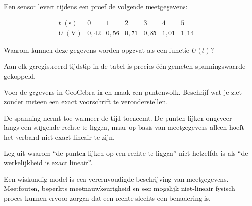 \documentclass{ximera}
\begin{document}
\begin{oefening}{\oefG}

Een sensor levert tijdens een proef de volgende meetgegevens:

\[
\begin{array}{c|cccccc}
t\;(\mathrm{s})&0&1&2&3&4&5\\
\hline
U\;(\mathrm{V})&0{,}42&0{,}56&0{,}71&0{,}85&1{,}01&1{,}14
\end{array}
\]

\begin{question}
Waarom kunnen deze gegevens worden opgevat als een functie \(U(t)\)?

\begin{oplossing}
Aan elk geregistreerd tijdstip in de tabel is precies één gemeten
spanningswaarde gekoppeld.
\end{oplossing}
\end{question}

\begin{question}
Voer de gegevens in GeoGebra in en maak een puntenwolk.
Beschrijf wat je ziet zonder meteen een exact voorschrift te veronderstellen.

\begin{oplossing}
De spanning neemt toe wanneer de tijd toeneemt. De punten lijken ongeveer
langs een stijgende rechte te liggen, maar op basis van meetgegevens alleen
hoeft het verband niet exact lineair te zijn.
\end{oplossing}
\end{question}

\begin{question}
Leg uit waarom ``de punten lijken op een rechte te liggen'' niet hetzelfde is
als ``de werkelijkheid is exact lineair''.

\begin{oplossing}
Een wiskundig model is een vereenvoudigde beschrijving van meetgegevens.
Meetfouten, beperkte meetnauwkeurigheid en een mogelijk niet-lineair fysisch
proces kunnen ervoor zorgen dat een rechte slechts een benadering is.
\end{oplossing}
\end{question}

\end{oefening}
\end{document}
